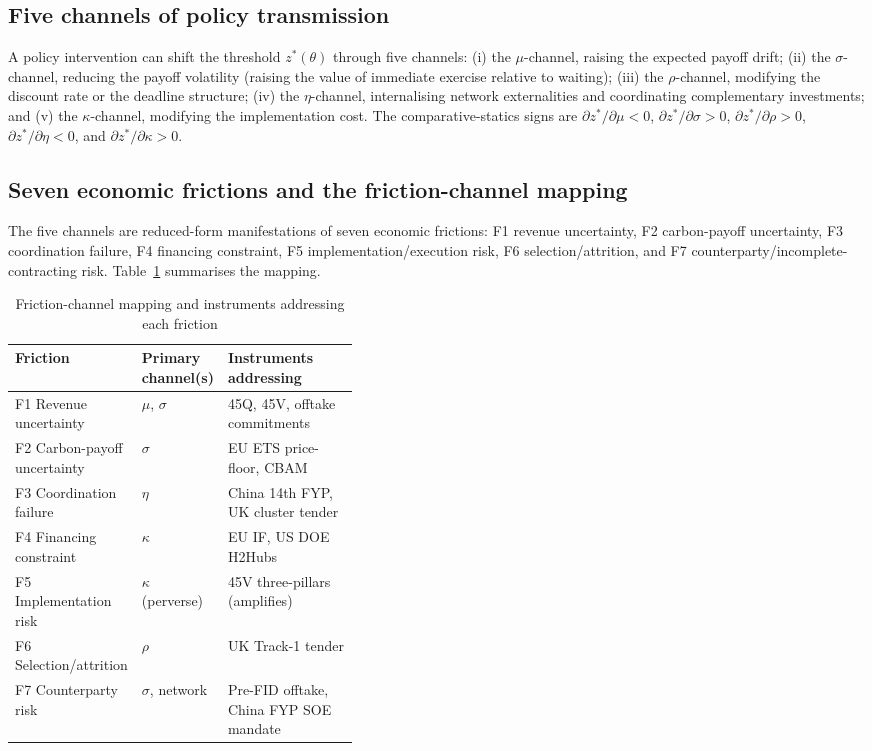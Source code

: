 \documentclass[12pt,a4paper]{article}
\theoremstyle{plain}
\theoremstyle{definition}
\begin{document}
\subsection{Five channels of policy transmission}
\label{sec:framework-channels}

A policy intervention can shift the threshold $z^{*}(\theta)$ through five channels: (i) the $\mu$-channel, raising the expected payoff drift; (ii) the $\sigma$-channel, reducing the payoff volatility (raising the value of immediate exercise relative to waiting); (iii) the $\rho$-channel, modifying the discount rate or the deadline structure; (iv) the $\eta$-channel, internalising network externalities and coordinating complementary investments; and (v) the $\kappa$-channel, modifying the implementation cost. The comparative-statics signs are $\partial z^{*}/\partial \mu < 0$, $\partial z^{*}/\partial \sigma > 0$, $\partial z^{*}/\partial \rho > 0$, $\partial z^{*}/\partial \eta < 0$, and $\partial z^{*}/\partial \kappa > 0$.

\subsection{Seven economic frictions and the friction-channel mapping}
\label{sec:framework-frictions}

The five channels are reduced-form manifestations of seven economic frictions: F1 revenue uncertainty, F2 carbon-payoff uncertainty, F3 coordination failure, F4 financing constraint, F5 implementation/execution risk, F6 selection/attrition, and F7 counterparty/incomplete-contracting risk. Table~\ref{tab:friction-channel} summarises the mapping.

\begin{table}[!htbp]
\centering
\caption{Friction-channel mapping and instruments addressing each friction}
\label{tab:friction-channel}
\small
\begin{tabular}{llp{0.40\linewidth}}
\toprule
Friction & Primary channel(s) & Instruments addressing \\
\midrule
F1 Revenue uncertainty & $\mu$, $\sigma$ & 45Q, 45V, offtake commitments \\
F2 Carbon-payoff uncertainty & $\sigma$ & EU ETS price-floor, CBAM \\
F3 Coordination failure & $\eta$ & China 14th FYP, UK cluster tender \\
F4 Financing constraint & $\kappa$ & EU IF, US DOE H2Hubs \\
F5 Implementation risk & $\kappa$ (perverse) & 45V three-pillars (amplifies) \\
F6 Selection/attrition & $\rho$ & UK Track-1 tender \\
F7 Counterparty risk & $\sigma$, network & Pre-FID offtake, China FYP SOE mandate \\
\bottomrule
\end{tabular}
\end{table}
\end{document}
